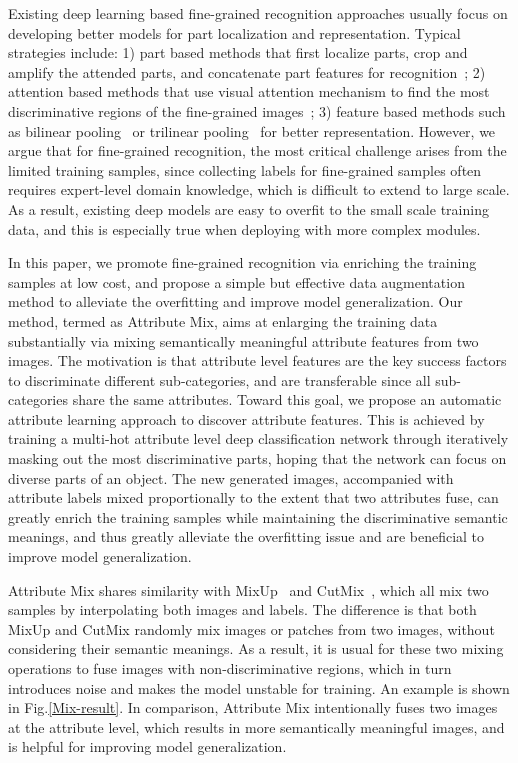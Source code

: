 \documentclass[runningheads]{llncs}
\begin{document}
Existing deep learning based fine-grained recognition approaches usually focus on developing better models for part localization and representation. Typical strategies include: 1) part based methods that first localize parts, crop and amplify the attended parts, and concatenate part features for recognition~\cite{lin2015deep,zhang2014part,branson2014bird,zhang2015fine}; 2) attention based methods that use visual attention mechanism to find the most discriminative regions of the fine-grained images~\cite{xiao2015application,fu2017look,zheng2017learning}; 3) feature based methods such as bilinear pooling~\cite{lin2015bilinear} or trilinear pooling~\cite{zheng2019looking} for better representation. However, we argue that for fine-grained recognition, the most critical challenge arises from the limited training samples, since collecting labels for fine-grained samples often requires expert-level domain knowledge, which is difficult to extend to large scale. As a result, existing deep models are easy to overfit to the small scale training data, and this is especially true when deploying with more complex modules.

In this paper, we promote fine-grained recognition via enriching the training samples at low cost, and propose a simple but effective data augmentation method to alleviate the overfitting and improve model generalization. Our method, termed as Attribute Mix, aims at enlarging the training data substantially via mixing semantically meaningful attribute features from two images. The motivation is that attribute level features are the key success factors to discriminate different sub-categories, and are transferable since all sub-categories share the same attributes. Toward this goal, we propose an automatic attribute learning approach to discover attribute features. This is achieved by training a multi-hot attribute level deep classification network through iteratively masking out the most discriminative parts, hoping that the network can focus on diverse parts of an object. The new generated images, accompanied with attribute labels mixed proportionally to the extent that two attributes fuse, can greatly enrich the training samples while maintaining the discriminative semantic meanings, and thus greatly alleviate the overfitting issue and are beneficial to improve model generalization.

Attribute Mix shares similarity with MixUp~\cite{zhang2017mixup} and CutMix~\cite{yun2019cutmix}, which all mix two samples by interpolating both images and labels. The difference is that both MixUp and CutMix randomly mix images or patches from two images, without considering their semantic meanings. As a result, it is usual for these two mixing operations to fuse images with non-discriminative regions, which in turn introduces noise and makes the model unstable for training. An example is shown in Fig.\ref{Mix-result}.  In comparison, Attribute Mix intentionally fuses two images at the attribute level, which results in more semantically meaningful images, and is helpful for improving model generalization.
\end{document}
